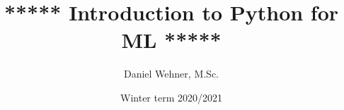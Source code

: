




\newcommand{\code}[2][fill=lightgray!50]{%
	\tikz[baseline]\node[%
        	inner ysep=0.5pt, 
        	inner xsep=2pt, 
        	anchor=text, 
        	rectangle, 
        	rounded corners=1mm,
        	#1] {\strut \texttt{#2}};%
}


\title[Introduction to Python for ML]{***** Introduction to Python for ML *****}
\author{Daniel Wehner, M.Sc.}
\date{Winter term 2020/2021}




\dwPrintTitle

\dwPrintToc


